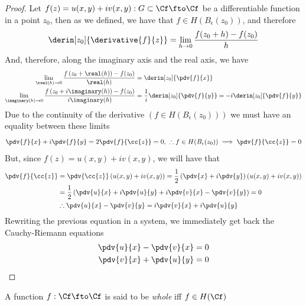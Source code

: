 \documentclass[../mmf.tex]{subfiles}
\begin{document}
\begin{proof}
	Let $f(z)=u(x,y)+iv(x,y):G\subset\Cf\fto\Cf$ be a differentiable function in a point $z_0$, then as we defined, we have that $f\in H(B_\epsilon(z_0))$, and therefore
	\begin{equation*}
		\derin[z_0]{\derivative{f}{z}}=\lim_{h\to0}\frac{f(z_0+h)-f(z_0)}{h}
	\end{equation*}
	And, therefore, along the imaginary axis and the real axis, we have
	\begin{equation*}
		\begin{aligned}
			\lim_{\real(h)\to0}\frac{f\left( z_0+\real(h) \right)-f(z_0)}{\real(h)}&=\derin[z_0]{\pdv{f}{x}}\\
			\lim_{\imaginary(h)\to0}\frac{f\left( z_0+i\imaginary(h) \right)-f(z_0)}{i\imaginary(h)}&=\frac{1}{i}\derin[z_0]{\pdv{f}{y}}=-i\derin[z_0]{\pdv{f}{y}}
		\end{aligned}
	\end{equation*}
	Due to the continuity of the derivative $\left( f\in H(B_\epsilon(z_0)) \right)$ we must have an equality between these limits
	\begin{equation*}
		\pdv{f}{x}+i\pdv{f}{y}=2\pdv{f}{\cc{z}}=0,\ \therefore f\in H(B_\epsilon(z_0))\implies{}\pdv{f}{\cc{z}}=0
	\end{equation*}
	But, since $f(z)=u(x,y)+iv(x,y)$, we will have that
	\begin{equation*}
		\begin{aligned}
			\pdv{f}{\cc{z}}&=\pdv{\cc{z}}\left( u(x,y)+iv(x,y) \right)=\frac{1}{2}\left( \pdv{x}+i\pdv{y} \right)\left( u(x,y)+iv(x,y) \right)\\
			&=\frac{1}{2}\left( \pdv{u}{x}+i\pdv{u}{y}+i\pdv{v}{x}-\pdv{v}{y} \right)=0\\
			&\therefore\pdv{u}{x}-\pdv{v}{y}=i\pdv{v}{x}+i\pdv{u}{y}
		\end{aligned}
	\end{equation*}
	Rewriting the previous equation in a system, we immediately get back the Cauchy-Riemann equations
	\begin{equation*}
		\begin{aligned}
			\pdv{u}{x}-\pdv{v}{x}&=0\\
			\pdv{v}{x}+\pdv{u}{y}&=0
		\end{aligned}
	\end{equation*}
\end{proof}
\begin{dfn}
	A function $f:\Cf\fto\Cf$ is said to be \textit{whole} iff $f\in H(\Cf)$
\end{dfn}
\end{document}
